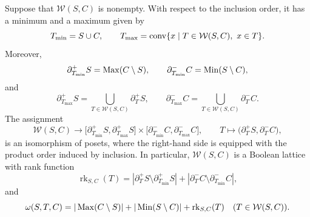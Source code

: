 \begin{proposition}
\label{prop:intermediate-boolean-structure}
Suppose that $\mathcal W(S,C)$ is nonempty.  With respect to the inclusion order, it has a minimum
and a maximum given by
\begin{equation}
\label{eq:intermediate-extremal-intervals}
T_{\min}
=
S\cup C,
\qquad
T_{\max}
=
\operatorname{conv}
\{x \mid T\in\mathcal W(S,C), \ x \in T\}.
\end{equation}
Moreover,
\begin{equation}
\label{eq:intermediate-minimum-boundaries}
\partial_{T_{\min}}^+S
=
\operatorname{Max}(C\setminus S),
\qquad
\partial_{T_{\min}}^-C
=
\operatorname{Min}(S\setminus C),
\end{equation}
and
\begin{equation}
\label{eq:intermediate-maximum-boundaries}
\partial_{T_{\max}}^+S
=
\bigcup_{T\in\mathcal W(S,C)}\partial_T^+S,
\qquad
\partial_{T_{\max}}^-C
=
\bigcup_{T\in\mathcal W(S,C)}\partial_T^-C.
\end{equation}
The assignment
\begin{equation}
\label{eq:intermediate-boolean-isomorphism}
\mathcal W(S,C)
\longrightarrow
\bigl[
\partial_{T_{\min}}^+S,
\partial_{T_{\max}}^+S
\bigr]
\times
\bigl[
\partial_{T_{\min}}^-C,
\partial_{T_{\max}}^-C
\bigr],
\qquad
T
\longmapsto
\bigl(
\partial_T^+S,
\partial_T^-C
\bigr),
\end{equation}
is an isomorphism of posets, where the right-hand side is equipped with the product order induced by inclusion.
In particular, $\mathcal W(S,C)$ is a Boolean
lattice with rank function
\begin{equation}
\label{eq:intermediate-boolean-rank}
\operatorname{rk}_{S,C}(T)
=
\left|
\partial_T^+S
\setminus
\partial_{T_{\min}}^+S
\right|
+
\left|
\partial_T^-C
\setminus
\partial_{T_{\min}}^-C
\right|,
\end{equation}
and 
\begin{equation}
\label{eq:omega-boolean-rank}
\omega(S,T,C)
=
|\operatorname{Max}(C\setminus S)|
+
|\operatorname{Min}(S\setminus C)|
+
\operatorname{rk}_{S,C}(T)
\quad 
(T\in\mathcal W(S,C)).
\end{equation}
\end{proposition}


